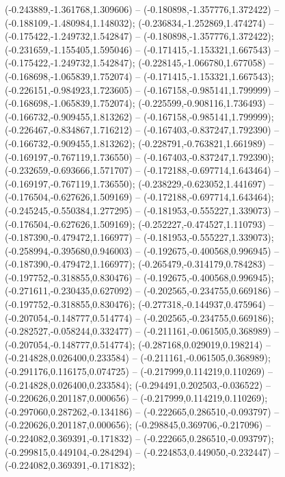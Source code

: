  (-0.243889,-1.361768,1.309606) -- (-0.180898,-1.357776,1.372422) -- (-0.188109,-1.480984,1.148032);
 (-0.236834,-1.252869,1.474274) -- (-0.175422,-1.249732,1.542847) -- (-0.180898,-1.357776,1.372422);
 (-0.231659,-1.155405,1.595046) -- (-0.171415,-1.153321,1.667543) -- (-0.175422,-1.249732,1.542847);
 (-0.228145,-1.066780,1.677058) -- (-0.168698,-1.065839,1.752074) -- (-0.171415,-1.153321,1.667543);
 (-0.226151,-0.984923,1.723605) -- (-0.167158,-0.985141,1.799999) -- (-0.168698,-1.065839,1.752074);
 (-0.225599,-0.908116,1.736493) -- (-0.166732,-0.909455,1.813262) -- (-0.167158,-0.985141,1.799999);
 (-0.226467,-0.834867,1.716212) -- (-0.167403,-0.837247,1.792390) -- (-0.166732,-0.909455,1.813262);
 (-0.228791,-0.763821,1.661989) -- (-0.169197,-0.767119,1.736550) -- (-0.167403,-0.837247,1.792390);
 (-0.232659,-0.693666,1.571707) -- (-0.172188,-0.697714,1.643464) -- (-0.169197,-0.767119,1.736550);
 (-0.238229,-0.623052,1.441697) -- (-0.176504,-0.627626,1.509169) -- (-0.172188,-0.697714,1.643464);
 (-0.245245,-0.550384,1.277295) -- (-0.181953,-0.555227,1.339073) -- (-0.176504,-0.627626,1.509169);
 (-0.252227,-0.474527,1.110793) -- (-0.187390,-0.479472,1.166977) -- (-0.181953,-0.555227,1.339073);
 (-0.258994,-0.395680,0.946003) -- (-0.192675,-0.400568,0.996945) -- (-0.187390,-0.479472,1.166977);
 (-0.265479,-0.314179,0.784283) -- (-0.197752,-0.318855,0.830476) -- (-0.192675,-0.400568,0.996945);
 (-0.271611,-0.230435,0.627092) -- (-0.202565,-0.234755,0.669186) -- (-0.197752,-0.318855,0.830476);
 (-0.277318,-0.144937,0.475964) -- (-0.207054,-0.148777,0.514774) -- (-0.202565,-0.234755,0.669186);
 (-0.282527,-0.058244,0.332477) -- (-0.211161,-0.061505,0.368989) -- (-0.207054,-0.148777,0.514774);
 (-0.287168,0.029019,0.198214) -- (-0.214828,0.026400,0.233584) -- (-0.211161,-0.061505,0.368989);
 (-0.291176,0.116175,0.074725) -- (-0.217999,0.114219,0.110269) -- (-0.214828,0.026400,0.233584);
 (-0.294491,0.202503,-0.036522) -- (-0.220626,0.201187,0.000656) -- (-0.217999,0.114219,0.110269);
 (-0.297060,0.287262,-0.134186) -- (-0.222665,0.286510,-0.093797) -- (-0.220626,0.201187,0.000656);
 (-0.298845,0.369706,-0.217096) -- (-0.224082,0.369391,-0.171832) -- (-0.222665,0.286510,-0.093797);
 (-0.299815,0.449104,-0.284294) -- (-0.224853,0.449050,-0.232447) -- (-0.224082,0.369391,-0.171832);
